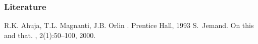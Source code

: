 \documentclass{beamer}
\begin{document}
	\begin{frame}[allowframebreaks]
  	\frametitle<presentation>{Literature}    
  	\begin{thebibliography}{10}    
		\beamertemplatearticlebibitems
		    R.K. Ahuja, T.L. Magnanti, J.B. Orlin
    			. Prentice Hall, 1993
		\beamertemplatearticlebibitems
    		S.~Jemand.
	    \newblock On this and that.
    		, 2(1):50--100, 2000.
	\end{thebibliography}
	\end{frame} 	 
 	 
\end{document}
